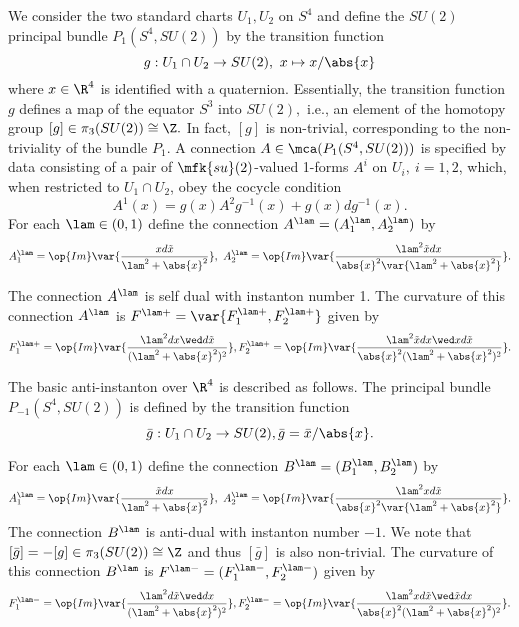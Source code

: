 \begin{exmp}
 We consider the two standard charts $U_{1}, U_{2}$ on $S^{4}$ and define the $SU\left( 2 \right)$ principal bundle
$P_{1}(S^{4}, SU(2))$ by the transition function
$$
g:U_{1} \cap U_{2} \to SU(2), \ x \mapsto x/\abs{x}
$$
where $x\in \R^{4}$ is identified with a quaternion. Essentially, the transition function $g$ defines a map of the
equator $S^{3}$ into $SU(2),$ i.e., an element of the homotopy group $[g] \in \pi_{3}(SU(2)) \cong \Z.$ In fact, $[g]$
is non-trivial, corresponding to the non-triviality of the bundle $P_{1}.$ A connection $A \in \mca (P_{1}(S^{4},
SU(2)))$ is specified by data consisting of a pair of $\mfk{su}(2)$-valued 1-forms $A^{i}$ on $U_{i}, \ i=1,2$, which,
when restricted to $U_{1}\cap U_{2}$, obey the cocycle condition
$$
A^{1}(x)=g(x)A^{2}g^{-1}(x)+g(x)dg^{-1}(x).
$$
For each $\lam \in (0,1)$ define the connection $A^{\lam}=(A^{\lam}_{1}, A^{\lam}_{2})$ by
$$
A^{\lam}_{1}= \op{Im}\var{\frac{xd\tilde{x}}{\lam^{2}+\abs{x}^{2}}}, \
A^{\lam}_{2}= \op{Im}\var{\frac{\lam^{2}\tilde{x}d{x}}{\abs{x}^{2}\var{\lam^{2}+\abs{x}^{2}}}}.
$$

The connection $A^{\lam}$ is self dual with instanton number 1. The curvature of this connection $A^{\lam}$ is
$F^{\lam+}=\var{F_{1}^{\lam +}, F_{2}^{\lam +}}$ given by
$$
F_{1}^{\lam +}= \op{Im}\var{\frac{\lam^{2}dx \wed d\tilde{x}}{(\lam^{2}+\abs{x}^{2})^{2}}},
F_{2}^{\lam +}= \op{Im}\var{\frac{\lam^{2}\tilde{x}dx \wed x d\tilde{x}}{\abs{x}^{2}(\lam^{2}+\abs{x}^{2})^{2}}}.
$$

The basic anti-instanton over $\R^{4}$ is described as follows. The principal bundle $P_{-1}(S^{4}, SU(2))$ is defined
by the transition function
$$
\bar{g}: U_{1} \cap U_{2}\to SU(2), \bar{g}=\bar{x}/\abs{x}.
$$

For each $\lam \in (0,1)$ define the connection $B^{\lam }=(B_{1}^{\lam}, B_{2}^{\lam})$ by
$$
A^{\lam}_{1}= \op{Im}\var{\frac{\tilde{x}dx}{\lam^{2}+\abs{x}^{2}}}, \
A^{\lam}_{2}= \op{Im}\var{\frac{\lam^{2}xd\tilde{x}}{\abs{x}^{2}\var{\lam^{2}+\abs{x}^{2}}}}.
$$
The connection $B^{\lam}$ is anti-dual with instanton number $-1$. We note that $[\bar{g}]=-[g]\in \pi_{3}(SU(2))\cong
\Z$ and thus $[\bar{g}]$ is also non-trivial. The curvature of this connection $B^{\lam}$ is
$F^{\lam-}=(F^{\lam-}_{1}, F_{2}^{\lam-})$ given by
$$
F_{1}^{\lam -}= \op{Im}\var{\frac{\lam^{2} d\tilde{x} \wed dx }{(\lam^{2}+\abs{x}^{2})^{2}}},
F_{2}^{\lam -}= \op{Im}\var{\frac{\lam^{2} x d\tilde{x} \wed \tilde{x}dx }{\abs{x}^{2}(\lam^{2}+\abs{x}^{2})^{2}}}.
$$
\end{exmp}



